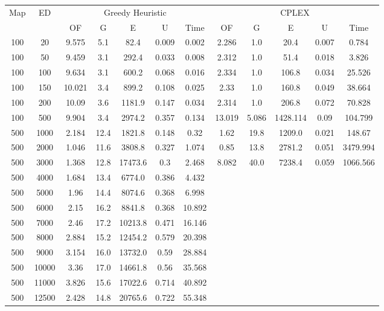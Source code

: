 \begin{table}[htb]
	\centering
	\begin{tabular}{|c|c|c|c|c|c|c|c|c|c|c|c|}
		\hline
		\multirow{2}{*}{Map} & \multirow{2}{*}{ED} & \multicolumn{5}{c|}{Greedy Heuristic} & \multicolumn{5}{c|}{CPLEX}\\ 
		\cline{3-12}
&& OF & G & E & U & Time & OF & G & E & U & Time\\ 
		\hline
		100 & 20 & 9.575 & 5.1 & 82.4 & 0.009 & 0.002 & 2.286 & 1.0 & 20.4 & 0.007 & 0.784 \\ 
		100 & 50 & 9.459 & 3.1 & 292.4 & 0.033 & 0.008 & 2.312 & 1.0 & 51.4 & 0.018 & 3.826 \\ 
		100 & 100 & 9.634 & 3.1 & 600.2 & 0.068 & 0.016 & 2.334 & 1.0 & 106.8 & 0.034 & 25.526 \\ 
		100 & 150 & 10.021 & 3.4 & 899.2 & 0.108 & 0.025 & 2.33 & 1.0 & 160.8 & 0.049 & 38.664 \\ 
		100 & 200 & 10.09 & 3.6 & 1181.9 & 0.147 & 0.034 & 2.314 & 1.0 & 206.8 & 0.072 & 70.828 \\ 
		100 & 500 & 9.904 & 3.4 & 2974.2 & 0.357 & 0.134 & 13.019 & 5.086 & 1428.114 & 0.09 & 104.799 \\ 
		500 & 1000 & 2.184 & 12.4 & 1821.8 & 0.148 & 0.32 & 1.62 & 19.8 & 1209.0 & 0.021 & 148.67 \\ 
		500 & 2000 & 1.046 & 11.6 & 3808.8 & 0.327 & 1.074 & 0.85 & 13.8 & 2781.2 & 0.051 & 3479.994 \\ 
		500 & 3000 & 1.368 & 12.8 & 17473.6 & 0.3 & 2.468 & 8.082 & 40.0 & 7238.4 & 0.059 & 1066.566 \\ 
		500 & 4000 & 1.684 & 13.4 & 6774.0 & 0.386 & 4.432 & & & & &  \\ 
		500 & 5000 & 1.96 & 14.4 & 8074.6 & 0.368 & 6.998 & & & & &  \\ 
		500 & 6000 & 2.15 & 16.2 & 8841.8 & 0.368 & 10.892 & & & & &  \\ 
		500 & 7000 & 2.46 & 17.2 & 10213.8 & 0.471 & 16.146 & & & & &  \\ 
		500 & 8000 & 2.884 & 15.2 & 12454.2 & 0.579 & 20.398 & & & & &  \\ 
		500 & 9000 & 3.154 & 16.0 & 13732.0 & 0.59 & 28.884 & & & & &  \\ 
		500 & 10000 & 3.36 & 17.0 & 14661.8 & 0.56 & 35.568 & & & & &  \\ 
		500 & 11000 & 3.826 & 15.6 & 17022.6 & 0.714 & 40.892 & & & & &  \\ 
		500 & 12500 & 2.428 & 14.8 & 20765.6 & 0.722 & 55.348 & & & & &  \\ 

\end{tabular}
\end{table}

